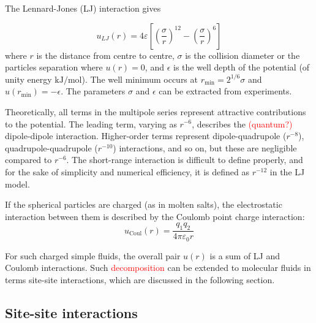 The Lennard-Jones (LJ) interaction gives

\begin{equation}
u_{LJ}(r)=4\varepsilon\left[\left(\frac{\sigma}{r}\right)^{12}-\left(\frac{\sigma}{r}\right)^{6}\right]
\end{equation}
where $r$ is the distance from centre to centre, $\sigma$ is the
collision diameter or the particles separation where $u(r)=0$, and
$\epsilon$ is the well depth of the potential (of unity energy $\mathrm{kJ/mol}$).
The well minimum occurs at $r_{\min}=2^{1/6}\sigma$ and $u(r_{\min})=-\epsilon$.
The parameters $\sigma$ and $\epsilon$ can be extracted from experiments.

Theoretically, all terms in the multipole series represent attractive
contributions to the potential. The leading term, varying as $r^{-6}$,
describes the \textcolor{red}{(quantum?)} dipole-dipole interaction.
Higher-order terms represent dipole-quadrupole ($r^{-8}$), quadrupole-quadrupole
($r^{-10}$) interactions, and so on, but these are negligible compared
to $r^{-6}$. The short-range interaction is difficult to define properly,
and for the sake of simplicity and numerical efficiency, it is defined as $r^{-12}$
in the LJ model. 

If the spherical particles are charged (as in molten salts), the electrostatic
interaction between them is described by the Coulomb point charge
interaction:
\begin{equation}
u_{\mathrm{Coul}}(r)=\frac{q_{1}q_{2}}{4\pi\varepsilon_{0}r}
\end{equation}

For such charged simple fluids, the overall pair $u(r)$ is a sum
of LJ and Coulomb interactions. Such \textcolor{red}{decomposition}
can be extended to molecular fluids in terms site-site interactions,
which are discussed in the following section.

\subsection{Site-site interactions}

